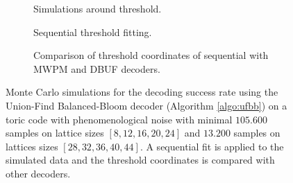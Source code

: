 \begin{figure}[htbp]
  \centering
  \begin{subfigure}[b]{0.49\textwidth}
    \begin{adjustbox}{Clip=0 1em 0 0}
      
    \end{adjustbox}
    \caption{Simulations around threshold.}
  \end{subfigure}
  \begin{subfigure}[b]{0.49\textwidth}
    \begin{adjustbox}{Clip=0 1em 0 0}
      
    \end{adjustbox}
    \caption{Sequential threshold fitting.}
  \end{subfigure}
  \begin{subfigure}[b]{\textwidth}
    \begin{adjustbox}{Clip=0 1em 0 0}
    
    \end{adjustbox}
    \caption{Comparison of threshold coordinates of sequential with MWPM and DBUF decoders.}
  \end{subfigure}
  \caption{Monte Carlo simulations for the decoding success rate using the Union-Find Balanced-Bloom decoder (Algorithm \ref{algo:ufbb}) on a toric code with phenomenological noise with minimal $105.600$ samples on lattice sizes $[8,12,16,20,24]$ and $13.200$ samples on lattices sizes $[28, 32, 36, 40, 44]$. A sequential fit is applied to the simulated data and the threshold coordinates is compared with other decoders.}
  \label{fig:thres_ufbb_toric_3d}
\end{figure}

